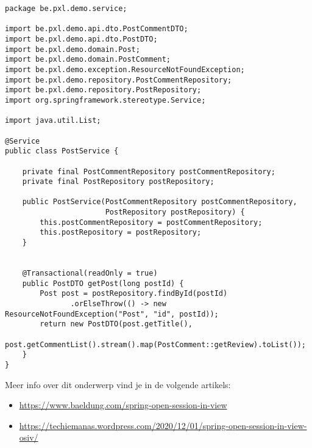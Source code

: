 \begin{lstlisting}
package be.pxl.demo.service;

import be.pxl.demo.api.dto.PostCommentDTO;
import be.pxl.demo.api.dto.PostDTO;
import be.pxl.demo.domain.Post;
import be.pxl.demo.domain.PostComment;
import be.pxl.demo.exception.ResourceNotFoundException;
import be.pxl.demo.repository.PostCommentRepository;
import be.pxl.demo.repository.PostRepository;
import org.springframework.stereotype.Service;

import java.util.List;

@Service
public class PostService {

    private final PostCommentRepository postCommentRepository;
    private final PostRepository postRepository;

    public PostService(PostCommentRepository postCommentRepository,
                       PostRepository postRepository) {
        this.postCommentRepository = postCommentRepository;
        this.postRepository = postRepository;
    }

   
	@Transactional(readOnly = true)
    public PostDTO getPost(long postId) {
        Post post = postRepository.findById(postId)
               .orElseThrow(() -> new ResourceNotFoundException("Post", "id", postId));
        return new PostDTO(post.getTitle(), 
                 post.getCommentList().stream().map(PostComment::getReview).toList());
    }
}
\end{lstlisting}

Meer info over dit onderwerp vind je in de volgende artikels:
\begin{itemize} 
\item \url{
https://www.baeldung.com/spring-open-session-in-view}
\item \url{https://techiemanas.wordpress.com/2020/12/01/spring-open-session-in-view-osiv/}

\end{itemize}

